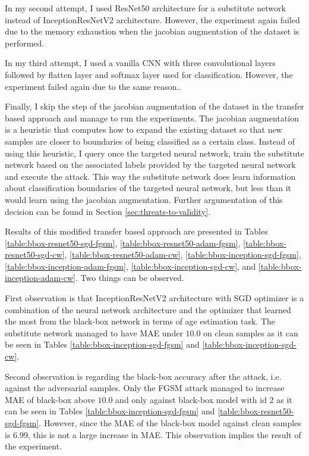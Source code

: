 In my second attempt, I used ResNet50 architecture for a substitute network instead of InceptionResNetV2 architecture. However, the experiment again failed  due to the memory exhaustion when the jacobian augmentation of the dataset is performed.  

In my third attempt, I used a vanilla CNN with three convolutional layers followed by flatten layer and softmax layer used for classification. However, the experiment failed again due to the same reason..


Finally, I skip the step of the jacobian augmentation of the dataset in the transfer based approach and manage to run the experiments. The jacobian augmentation is a heuristic that computes how to expand the existing dataset so that new samples are closer to boundaries of being classified as a certain class. Instead of using this heuristic, I query once the targeted neural network, train the substitute network based on the associated labels provided by the targeted neural network and execute the attack. This way the substitute network does learn information about classification boundaries of the targeted neural network, but less than it would learn using the jacobian augmentation. Further argumentation of this decision can be found in Section \ref{sec:threats-to-validity}.

Results of this modified transfer based approach are presented in Tables
\ref{table:bbox-resnet50-sgd-fgsm},
\ref{table:bbox-resnet50-adam-fgsm}, 
\ref{table:bbox-resnet50-sgd-cw},
\ref{table:bbox-resnet50-adam-cw}, 
\ref{table:bbox-inception-sgd-fgsm},
\ref{table:bbox-inception-adam-fgsm}, 
\ref{table:bbox-inception-sgd-cw}, and
\ref{table:bbox-inception-adam-cw}. Two things can be observed.

First observation is that InceptionResNetV2 architecture with SGD optimizer is a combination of the neural network architecture and the optimizer that learned the most from the black-box network in terms of age estimation task. The substitute network managed to have MAE under $10.0$ on clean samples as it can be seen in Tables \ref{table:bbox-inception-sgd-fgsm} and \ref{table:bbox-inception-sgd-cw}. 

Second observation is regarding the black-box accuracy after the attack, i.e. against the adversarial samples. Only the FGSM attack managed to increase MAE of black-box above $10.0$ and only against black-box model with id 2 as it can be seen in Tables \ref{table:bbox-inception-sgd-fgsm} and \ref{table:bbox-resnet50-sgd-fgsm}. However, since the MAE of the black-box model against clean samples is $6.99$, this is not a large increase in MAE. This observation implies the result of the experiment. 

